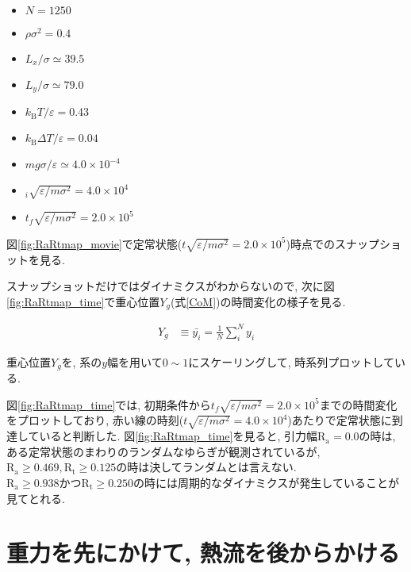 \begin{itemize}
  \item $N = 1250$
  \item $\rho {\sigma}^2 = 0.4$
  \item $L_x / \sigma \simeq 39.5$
  \item $L_y / \sigma \simeq 79.0$
  \item $k_{\text{B}} T / \varepsilon = 0.43$
  \item $k_{\text{B}} \Delta T / \varepsilon = 0.04$
  \item $mg\sigma/\varepsilon \simeq 4.0 \times 10^{-4}$
  \item $_i \sqrt{\varepsilon / m \sigma^2}= 4.0 \times 10^4$
  \item $t_f \sqrt{\varepsilon / m \sigma^2} = 2.0 \times 10^{5}$
\end{itemize}

図\ref{fig:RaRtmap_movie}で定常状態($t\sqrt{\varepsilon / m \sigma^2} = 2.0 \times 10^{5}$)時点でのスナップショットを見る.



スナップショットだけではダイナミクスがわからないので, 次に図\ref{fig:RaRtmap_time}で重心位置$Y_g$(式\eqref{CoM})の時間変化の様子を見る. 

\begin{align}
  \label{CoM}
  Y_g &\equiv \bar{y_i} = \frac{1}{N} \sum_{i}^{N} y_i
\end{align}

重心位置$Y_g$を, 系の$y$幅を用いて$0\sim 1$にスケーリングして, 時系列プロットしている.



図\ref{fig:RaRtmap_time}では, 初期条件から$t_f \sqrt{\varepsilon / m \sigma^2} = 2.0 \times 10^{5}$までの時間変化をプロットしており, 赤い線の時刻($t \sqrt{\varepsilon / m \sigma^2}= 4.0 \times 10^4$)あたりで定常状態に到達していると判断した. 図\ref{fig:RaRtmap_time}を見ると, 引力幅$\text{R}_\text{a}=0.0$の時は, ある定常状態のまわりのランダムなゆらぎが観測されているが, $\text{R}_\text{a} \ge 0.469, \text{R}_\text{t} \ge 0.125$の時は決してランダムとは言えない. $\text{R}_\text{a} \ge 0.938 かつ\text{R}_\text{t} \ge 0.250$の時には周期的なダイナミクスが発生していることが見てとれる. 

\section{重力を先にかけて, 熱流を後からかける}\label{sec:RaRtmap_drop}

